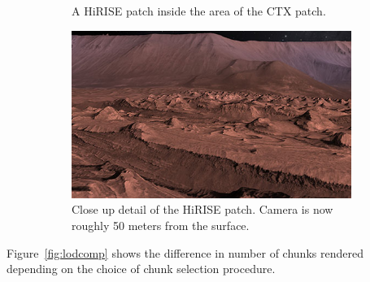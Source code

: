 \documentclass[journal]{vgtc}                %
\newcommand{\fig}[1]{Figure~\ref{fig:#1}}
\begin{document}
\begin{figure}
\begin{subfigure}[tb]{0.24\textwidth}
	\caption{A HiRISE patch inside the area of the CTX patch.}
    \end{subfigure}
    \begin{subfigure}[tb]{0.24\textwidth}
    	\includegraphics[width=\textwidth]{figures/west_candor_chasma3.jpg}
	\caption{Close up detail of the HiRISE patch. Camera is now roughly 50 meters from the surface.}
    \end{subfigure}
    \caption{}
    \label{fig:globebrowsingmars}
\end{figure}


\fig{lodcomp} shows the difference in number of chunks rendered depending on the choice of chunk selection procedure.
\end{document}
